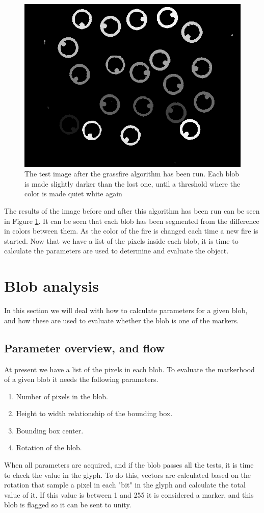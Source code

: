 \begin{figure}
	\centering
	\includegraphics[width=0.6\linewidth]{figure/Analysis/grassfire.png}
	\caption{The test image after the grassfire algorithm has been run. Each blob is made slightly darker than the lost one, until a threshold where the color is made quiet white again}
	\label{fig:grsnapshot}
\end{figure} 
The results of the image before and after this algorithm has been run can be seen in Figure \ref{fig:grsnapshot}. It can be seen that each blob has been segmented from the difference in colors between them. As the color of the fire is changed each time a new fire is started. Now that we have a list of the pixels inside each blob, it is time to calculate the parameters are used to determine and evaluate the object.
\section{Blob analysis}
In this section we will deal with how to calculate parameters for a given blob, and how these are used to evaluate whether the blob is one of the markers.
\subsection{Parameter overview, and flow }
At present we have a list of the pixels in each blob. To evaluate the markerhood of a given blob it needs the following parameters.
\begin{enumerate}
	\item Number of pixels in the blob.
	\item Height to width relationship of the bounding box.
	\item Bounding box center.
	\item Rotation of the blob.
\end{enumerate}
When all parameters are acquired, and if the blob passes all the tests, it is time to check the value in the glyph. To do this, vectors are calculated based on the rotation that sample a pixel in each "bit" in the glyph and calculate the total value of it. If this value is between 1 and 255 it is considered a marker, and this blob is flagged so it can be sent to unity.\\\\

